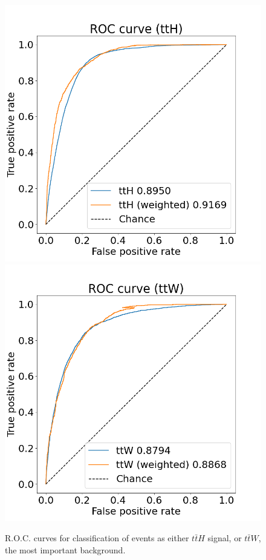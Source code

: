 \begin{figure}[ht]
    \centering

    \includegraphics[scale=0.25]{res/MLPlots/ROC_ttH.png}
    \includegraphics[scale=0.25]{res/MLPlots/ROC_ttW.png}

    \caption{R.O.C. curves for classification of events as either $t\bar{t}H$ signal, or $t\bar{t}W$, the most important background.}
    \label{rocSignalAndBackground}
\end{figure}
